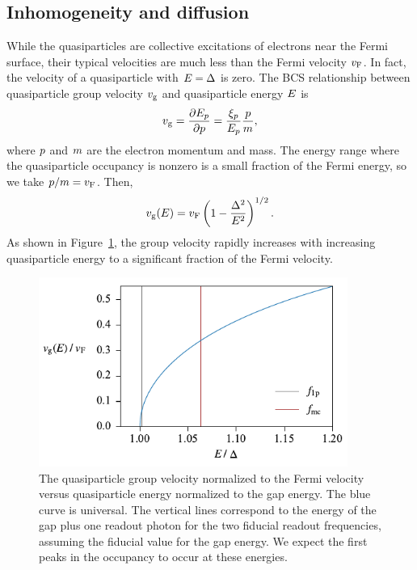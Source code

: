 \subsection{Inhomogeneity and diffusion}
\label{sec:theory.quasiparticle.inhomogeneity}

While the quasiparticles are collective excitations of electrons near the Fermi surface, their typical velocities are much less than the Fermi velocity $v_{\mathrm{F}}$.
In fact, the velocity of a quasiparticle with $E = \Delta$ is zero.
The BCS relationship between quasiparticle group velocity $v_{\mathrm{g}}$ and quasiparticle energy $E$ is
\begin{align}
v_{\mathrm{g}}
  =
  \pdv{E_p}{p}
  =
  \frac{\xi_p}{E_p} \frac{p}{m},
\end{align}
where $p$ and $m$ are the electron momentum and mass.
The energy range where the quasiparticle occupancy is nonzero is a small fraction of the Fermi energy, so we take
$p / m = v_{\mathrm{F}}$.
Then,
\begin{equation}
v_{\mathrm{g}}(E)
  =
  v_{\mathrm{F}} \left( 1 - \frac{\Delta^2}{E^2} \right)^{1/2}.
\end{equation}
As shown in Figure~\ref{fig:quasiparticle_group_velocity}, the group velocity rapidly increases with increasing quasiparticle energy to a significant fraction of the Fermi velocity.

\begin{figure}[htb]
\centering
\includegraphics[width=0.9\textwidth]{theory/quasiparticle_group_velocity.pdf}
\caption[The quasiparticle group velocity versus quasiparticle energy.]
{
The quasiparticle group velocity normalized to the Fermi velocity versus quasiparticle energy normalized to the gap energy.
The blue curve is universal.
The vertical lines correspond to the energy of the gap plus one readout photon for the two fiducial readout frequencies, assuming the fiducial value for the gap energy.
We expect the first peaks in the occupancy to occur at these energies.
}
\label{fig:quasiparticle_group_velocity}
\end{figure}


